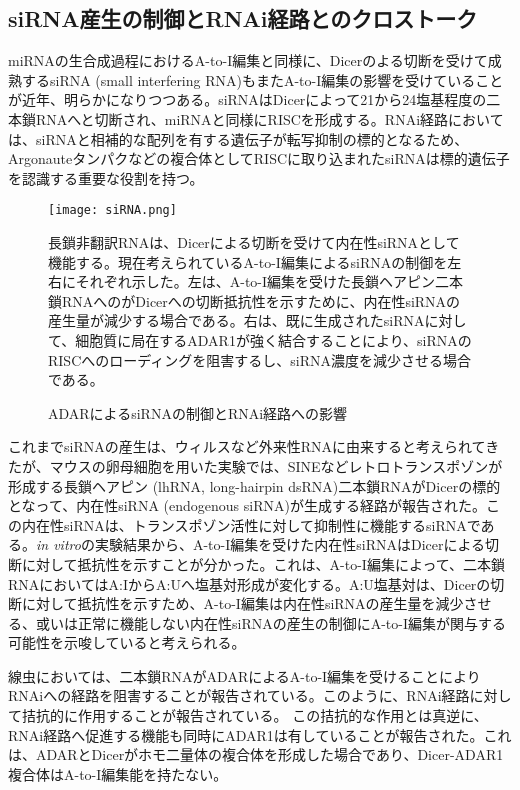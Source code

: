 \subsection{siRNA産生の制御とRNAi経路とのクロストーク}
miRNAの生合成過程におけるA-to-I編集と同様に、Dicerのよる切断を受けて成熟するsiRNA (small interfering RNA)もまたA-to-I編集の影響を受けていることが近年、明らかになりつつある。siRNAはDicerによって21から24塩基程度の二本鎖RNAへと切断され、miRNAと同様にRISCを形成する。RNAi経路においては、siRNAと相補的な配列を有する遺伝子が転写抑制の標的となるため、Argonauteタンパクなどの複合体としてRISCに取り込まれたsiRNAは標的遺伝子を認識する重要な役割を持つ。

\begin{figure}[!h]
	\begin{center}
		\texttt{[image: siRNA.png]}
	\end{center}
	\caption{ADARによるsiRNAの制御とRNAi経路への影響}
	\begin{flushleft}
		\small{長鎖非翻訳RNAは、Dicerによる切断を受けて内在性siRNAとして機能する。現在考えられているA-to-I編集によるsiRNAの制御を左右にそれぞれ示した。左は、A-to-I編集を受けた長鎖ヘアピン二本鎖RNAへのがDicerへの切断抵抗性を示すために、内在性siRNAの産生量が減少する場合である。右は、既に生成されたsiRNAに対して、細胞質に局在するADAR1が強く結合することにより、siRNAのRISCへのローディングを阻害するし、siRNA濃度を減少させる場合である。}
	\end{flushleft}
	\label{fig:adar_siRNA}
\end{figure}

これまでsiRNAの産生は、ウィルスなど外来性RNAに由来すると考えられてきたが、マウスの卵母細胞を用いた実験では、SINEなどレトロトランスポゾンが形成する長鎖ヘアピン (lhRNA, long-hairpin dsRNA)二本鎖RNAがDicerの標的となって、内在性siRNA (endogenous siRNA)が生成する経路が報告された。この内在性siRNAは、トランスポゾン活性に対して抑制性に機能するsiRNAである。\textit{in vitro}の実験結果から、A-to-I編集を受けた内在性siRNAはDicerによる切断に対して抵抗性を示すことが分かった。これは、A-to-I編集によって、二本鎖RNAにおいてはA:IからA:Uへ塩基対形成が変化する。A:U塩基対は、Dicerの切断に対して抵抗性を示すため、A-to-I編集は内在性siRNAの産生量を減少させる、或いは正常に機能しない内在性siRNAの産生の制御にA-to-I編集が関与する可能性を示唆していると考えられる。
\par
線虫においては、二本鎖RNAがADARによるA-to-I編集を受けることによりRNAiへの経路を阻害することが報告されている。このように、RNAi経路に対して拮抗的に作用することが報告されている。
この拮抗的な作用とは真逆に、RNAi経路へ促進する機能も同時にADAR1は有していることが報告された。これは、ADARとDicerがホモ二量体の複合体を形成した場合であり、Dicer-ADAR1複合体はA-to-I編集能を持たない。

